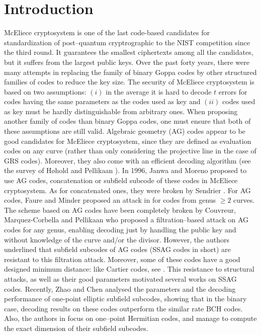 \documentclass[a4paper]{article}
\theoremstyle{definition}
\theoremstyle{remark}
\begin{document}
\section*{Introduction}
McEliece cryptosystem is one of the last code-based candidates for standardization of post--quantum cryptrographic to the NIST competition since the third round. It guarantees the smallest ciphertexts among all the candidates, but it suffers from the largest public keys. Over the past forty years, there were many attempts in replacing the family of binary Goppa codes by other structured families of codes to reduce the key size.
The security of McEliece cryptosystem is based on two assumptions: $(i)$ in the average it is hard to decode $t$ errors for codes having the same parameters as the codes used as key and $(ii)$ codes used as key must be hardly distinguishable from arbitrary ones. When proposing another family of codes than binary Goppa codes, one must ensure that both of these assumptions are still valid.
Algebraic geometry (AG) codes appear to be good candidates for McEliece cryptosystem, since they are defined as evaluation codes on any curve (rather than only considering the projective line in the case of GRS codes). Moreover, they also come with an efficient decoding algorithm (see the survey of H\o hold and Pellikaan \cite{HP95}).
In 1996, Janwa and Moreno \cite{JM96} proposed to use AG codes, concatenation or subfield subcode of these codes in McEliece cryptosystem. As for concatenated ones, they were broken by Sendrier \cite{Sen94}. For AG codes, Faure and Minder proposed an attack in \cite{FM08,Min07,Fau09} for codes from genus $\geq 2$ curves. The scheme based on AG codes have been completely broken by Couvreur, Marquez-Corbella and Pellikaan \cite{CMR17} who proposed a filtration--based attack on AG codes for any genus, enabling decoding just by handling the public key and without knowledge of the curve and/or the divisor. However, the authors underlined that subfield subcodes of AG codes (SSAG codes in short) are resistant to this filtration attack. Moreover, some of these codes have a good designed minimum distance: like Cartier codes, see \cite{Cou14}. This resistance to structural attacks, as well as their good parameters motivated several works on SSAG codes. Recently, Zhao and Chen \cite{ZC22} analysed the parameters and the decoding performance of one-point elliptic subfield subcodes, showing that in the binary case, decoding results on these codes outperform the similar rate BCH codes. Also, the authors in \cite{PJ14,EKN21} focus on one--point Hermitian codes, and manage to compute the exact dimension of their subfield subcodes. 
\end{document}
